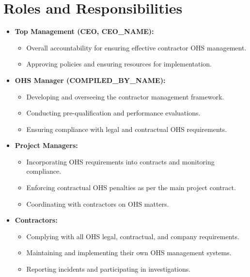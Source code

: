 \documentclass[12pt]{article}
\begin{document}
\section{Roles and Responsibilities}
\begin{itemize}
    \item \textbf{Top Management (CEO, {{CEO_NAME}}):}
    \begin{itemize}
        \item Overall accountability for ensuring effective contractor OHS management.
        \item Approving policies and ensuring resources for implementation.
    \end{itemize}
    \item \textbf{OHS Manager ({{COMPILED_BY_NAME}}):}
    \begin{itemize}
        \item Developing and overseeing the contractor management framework.
        \item Conducting pre-qualification and performance evaluations.
        \item Ensuring compliance with legal and contractual OHS requirements.
    \end{itemize}
    \item \textbf{Project Managers:}
    \begin{itemize}
        \item Incorporating OHS requirements into contracts and monitoring compliance.
        \item Enforcing contractual OHS penalties as per the main project contract.
        \item Coordinating with contractors on OHS matters.
    \end{itemize}
    \item \textbf{Contractors:}
    \begin{itemize}
        \item Complying with all OHS legal, contractual, and company requirements.
        \item Maintaining and implementing their own OHS management systems.
        \item Reporting incidents and participating in investigations.
    \end{itemize}
\end{itemize}
\end{document}
